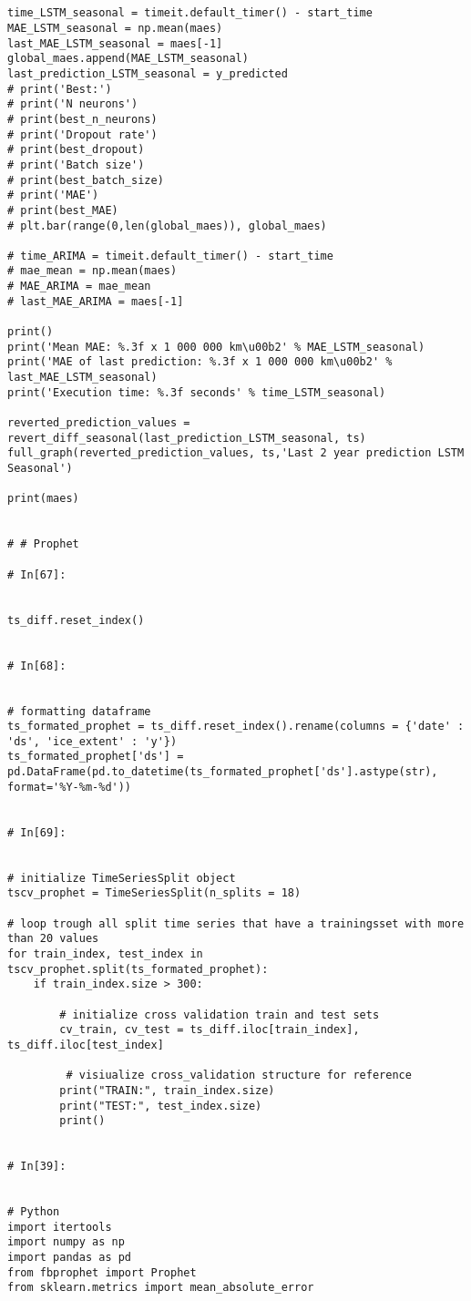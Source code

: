 \begin{verbatim}
        

time_LSTM_seasonal = timeit.default_timer() - start_time
MAE_LSTM_seasonal = np.mean(maes)
last_MAE_LSTM_seasonal = maes[-1]
global_maes.append(MAE_LSTM_seasonal)
last_prediction_LSTM_seasonal = y_predicted
# print('Best:')
# print('N neurons')
# print(best_n_neurons)
# print('Dropout rate')
# print(best_dropout)
# print('Batch size')
# print(best_batch_size)
# print('MAE')
# print(best_MAE)
# plt.bar(range(0,len(global_maes)), global_maes)

# time_ARIMA = timeit.default_timer() - start_time
# mae_mean = np.mean(maes)
# MAE_ARIMA = mae_mean
# last_MAE_ARIMA = maes[-1]

print()
print('Mean MAE: %.3f x 1 000 000 km\u00b2' % MAE_LSTM_seasonal)
print('MAE of last prediction: %.3f x 1 000 000 km\u00b2' % last_MAE_LSTM_seasonal)
print('Execution time: %.3f seconds' % time_LSTM_seasonal)

reverted_prediction_values = revert_diff_seasonal(last_prediction_LSTM_seasonal, ts)
full_graph(reverted_prediction_values, ts,'Last 2 year prediction LSTM Seasonal')

print(maes)


# # Prophet

# In[67]:


ts_diff.reset_index()


# In[68]:


# formatting dataframe
ts_formated_prophet = ts_diff.reset_index().rename(columns = {'date' : 'ds', 'ice_extent' : 'y'})
ts_formated_prophet['ds'] = pd.DataFrame(pd.to_datetime(ts_formated_prophet['ds'].astype(str), format='%Y-%m-%d'))


# In[69]:


# initialize TimeSeriesSplit object
tscv_prophet = TimeSeriesSplit(n_splits = 18)

# loop trough all split time series that have a trainingsset with more than 20 values
for train_index, test_index in tscv_prophet.split(ts_formated_prophet):
    if train_index.size > 300:

        # initialize cross validation train and test sets
        cv_train, cv_test = ts_diff.iloc[train_index], ts_diff.iloc[test_index]
        
         # visiualize cross_validation structure for reference
        print("TRAIN:", train_index.size)
        print("TEST:", test_index.size)
        print()


# In[39]:


# Python
import itertools
import numpy as np
import pandas as pd
from fbprophet import Prophet
from sklearn.metrics import mean_absolute_error



\end{verbatim}
